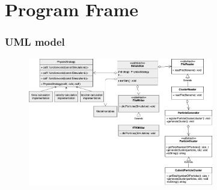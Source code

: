 
\section{Program Frame}

\begin{frame}
    \frametitle{UML model}


    \begin{figure}[H]
        \includegraphics[width=0.72\textwidth]{../../res/UML.png}
    \end{figure}


\end{frame}
